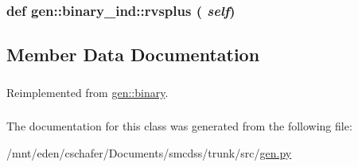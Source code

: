 \hypertarget{classgen_1_1binary__ind_12b4f2b47589e167adfd9a96b6b522e3}{
\subsubsection[{rvsplus}]{\setlength{\rightskip}{0pt plus 5cm}def gen::binary\_\-ind::rvsplus ( {\em self})}}
\label{classgen_1_1binary__ind_12b4f2b47589e167adfd9a96b6b522e3}




\subsection{Member Data Documentation}
\hypertarget{classgen_1_1binary__ind_8f25f23a5444665383f9551a365448d0}{
\subsubsection[{name}]{}}
\label{classgen_1_1binary__ind_8f25f23a5444665383f9551a365448d0}


\hypertarget{classgen_1_1binary__ind_aaf37ef74e482395cbcfb9ceaf1b564a}{
\subsubsection[{p}]{}}
\label{classgen_1_1binary__ind_aaf37ef74e482395cbcfb9ceaf1b564a}




Reimplemented from \hyperlink{classgen_1_1binary_838502808c65c543b3cb558435047f92}{gen::binary}.\hypertarget{classgen_1_1binary__ind_b652d5708c5922cd848116cea088ae0f}{
\subsubsection[{uniform}]{}}
\label{classgen_1_1binary__ind_b652d5708c5922cd848116cea088ae0f}




The documentation for this class was generated from the following file:\begin{CompactItemize}
\item 
/mnt/eden/cschafer/Documents/smcdss/trunk/src/\hyperlink{gen_8py}{gen.py}\end{CompactItemize}
